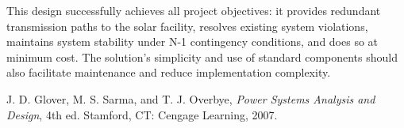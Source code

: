 \documentclass[conference]{IEEEtran}
\begin{document}
This design successfully achieves all project objectives: it provides redundant transmission paths to the solar facility, resolves existing system violations, maintains system stability under N-1 contingency conditions, and does so at minimum cost. The solution's simplicity and use of standard components should also facilitate maintenance and reduce implementation complexity.
\begin{thebibliography}{9}
	 J. D. Glover, M. S. Sarma, and T. J. Overbye, \textit{Power Systems Analysis and Design}, 4th ed. Stamford, CT: Cengage Learning, 2007.
\end{thebibliography}
\end{document}
